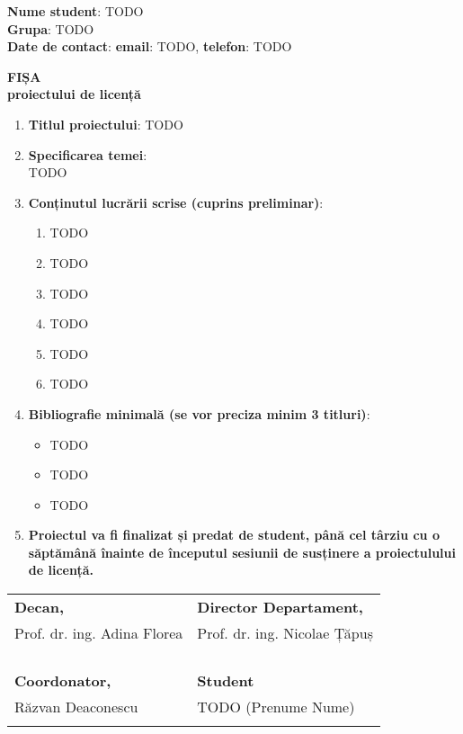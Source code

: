 \documentclass[12pt]{cse-form}
\begin{document}
\textbf{Nume student}: TODO \\
\textbf{Grupa}: TODO \\
\textbf{Date de contact}: \textbf{email}: TODO, \textbf{telefon}: TODO

\vspace{7mm}

\begin{center}
  \large{\textbf{FIȘA\\
  proiectului de licență}}
\end{center}

\vspace{7mm}

\begin{enumerate}
  \item \textbf{Titlul proiectului}: TODO
  \item \textbf{Specificarea temei}:\\
    TODO
  \item \textbf{Conținutul lucrării scrise (cuprins preliminar)}:
    \begin{enumerate}
      \item TODO
      \item TODO
      \item TODO
      \item TODO
      \item TODO
      \item TODO
    \end{enumerate}
  \item \textbf{Bibliografie minimală (se vor preciza minim 3 titluri)}:
    \begin{itemize}
      \item TODO
      \item TODO
      \item TODO
    \end{itemize}
  \item \textbf{Proiectul va fi finalizat și predat de student, până cel
      târziu cu o săptămână înainte de începutul sesiunii de susținere a
    proiectulului de licență.}
\end{enumerate}

\vspace{10mm}

\begin{center}
  \begin{tabular}{@{}p{}p{}@{}}
    \textbf{Decan,} & \textbf{Director Departament,} \\
    Prof. dr. ing. Adina Florea & Prof. dr. ing. Nicolae Țăpuș \\
    & \\
    & \\
    & \\
    & \\
    \textbf{Coordonator,} & \textbf{Student} \\
    Răzvan Deaconescu & TODO (Prenume Nume) \\
    & \\
  \end{tabular}
\end{center}
\end{document}
